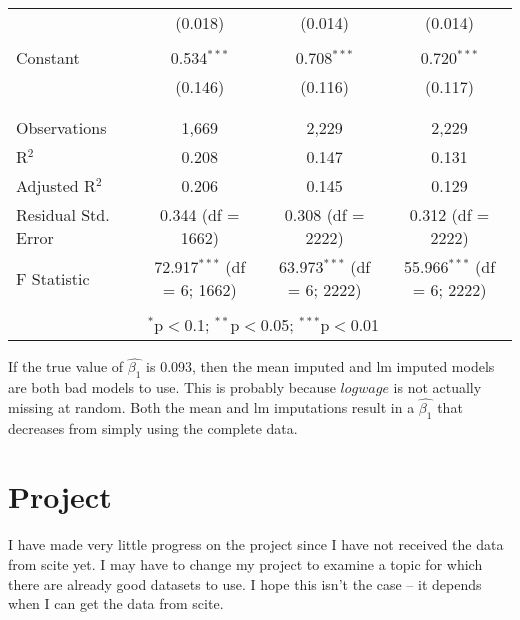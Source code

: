 \documentclass{article}
\begin{document}
\begin{table}[!htbp]
\begin{tabular}{@{\extracolsep{5pt}}lccc}
  & (0.018) & (0.014) & (0.014) \\ 
  & & & \\ 
 Constant & 0.534$^{***}$ & 0.708$^{***}$ & 0.720$^{***}$ \\ 
  & (0.146) & (0.116) & (0.117) \\ 
  & & & \\ 
\hline \\[-1.8ex] 
Observations & 1,669 & 2,229 & 2,229 \\ 
R$^{2}$ & 0.208 & 0.147 & 0.131 \\ 
Adjusted R$^{2}$ & 0.206 & 0.145 & 0.129 \\ 
Residual Std. Error & 0.344 (df = 1662) & 0.308 (df = 2222) & 0.312 (df = 2222) \\ 
F Statistic & 72.917$^{***}$ (df = 6; 1662) & 63.973$^{***}$ (df = 6; 2222) & 55.966$^{***}$ (df = 6; 2222) \\ 
\hline 
\hline \\[-1.8ex] 
\multicolumn{3}{r}{$^{*}$p$<$0.1; $^{**}$p$<$0.05; $^{***}$p$<$0.01} \\ 
\end{tabular} 
\end{table} 

If the true value of $\hat{\beta_1}$ is 0.093, then the mean imputed and lm imputed models are both bad models to use. This is probably because $logwage$ is not actually missing at random. Both the mean and lm imputations result in a $\hat{\beta_1}$ that decreases from simply using the complete data.

\clearpage
\section{Project}

I have made very little progress on the project since I have not received the data from scite yet. I may have to change my project to examine a topic for which there are already good datasets to use. I hope this isn't the case -- it depends when I can get the data from scite.
\end{document}
